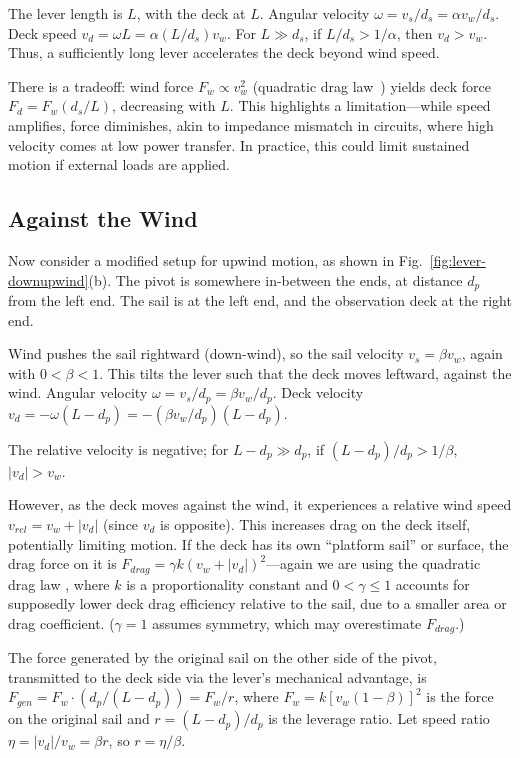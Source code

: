 \documentclass[reprint,aps,pra,superscriptaddress,longbibliography]{revtex4-2}
\begin{document}
The lever length is $L$, with the deck at $L$. Angular velocity $\omega = v_s / d_s = \alpha v_w / d_s$. Deck speed $v_d = \omega L = \alpha (L / d_s) v_w$. For $L \gg d_s$, if $L / d_s > 1/\alpha$, then $v_d > v_w$. Thus, a sufficiently long lever accelerates the deck beyond wind speed.

There is a tradeoff: wind force $F_w \propto v_w^2$ (quadratic drag law~\cite{Anderson2024}) yields deck force $F_d = F_w (d_s / L)$, decreasing with $L$. This highlights a limitation---while speed amplifies, force diminishes, akin to impedance mismatch in circuits, where high velocity comes at low power transfer. In practice, this could limit sustained motion if external loads are applied.

\subsection{Against the Wind}

Now consider a modified setup for upwind motion, as shown in Fig.~\ref{fig:lever-downupwind}(b). The pivot is somewhere in-between the ends, at distance $d_p$ from the left end. The sail is at the left end, and the observation deck at the right end.



Wind pushes the sail rightward (down-wind), so the sail velocity $v_s = \beta v_w$, again with $0 <\beta <1$. This tilts the lever such that the deck moves leftward, against the wind. Angular velocity $\omega = v_s / d_p = \beta v_w / d_p$. Deck velocity $v_d = -\omega (L - d_p) = -(\beta v_w / d_p) (L - d_p)$.

The relative velocity is negative; for $L - d_p \gg d_p$, if $(L - d_p)/d_p > 1/\beta$, $|v_d| > v_w$.


However, as the deck moves against the wind, it experiences a relative wind speed $v_{rel} = v_w + |v_d|$ (since $v_d$ is opposite).
This increases drag on the deck itself, potentially limiting motion.
If the deck has its own ``platform sail'' or surface, the drag force on it is $F_{drag} = \gamma k (v_w + |v_d|)^2$---again
we are using the quadratic drag law \cite{Anderson2024},
where $k$ is a proportionality constant and $0< \gamma \leq 1$ accounts for supposedly lower deck drag efficiency relative to the sail,
due to a smaller area or drag coefficient. ($\gamma=1$ assumes symmetry, which may overestimate $F_{drag}$.)

The force generated by the original sail on the other side of the pivot,
 transmitted to the deck side via the lever's mechanical advantage,
is $F_{gen} = F_w \cdot (d_p / (L - d_p)) = F_w / r$, where $F_w = k [v_w (1 - \beta)]^2$
is the force on the original sail and $r = (L - d_p)/d_p$ is the leverage ratio.
 Let speed ratio $\eta = |v_d| / v_w = \beta r$, so $r = \eta / \beta$.
\end{document}
